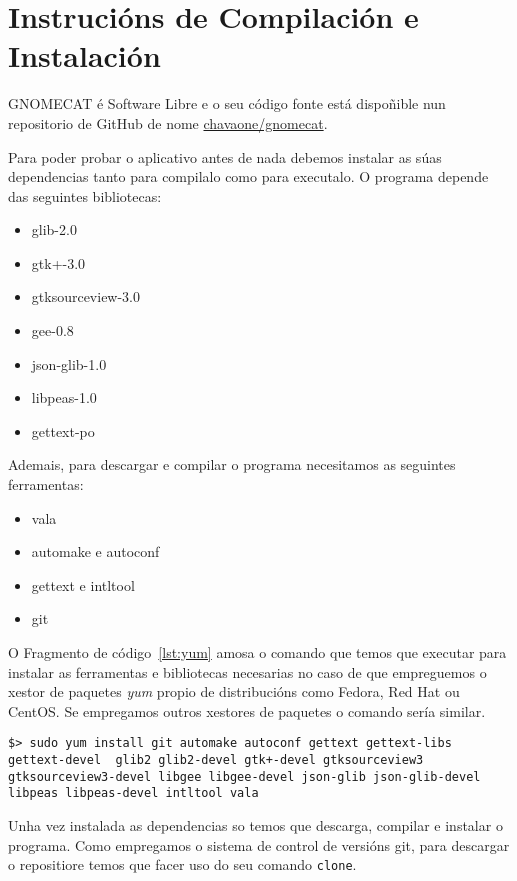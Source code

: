 \chapter{Instrucións de Compilación e Instalación}

GNOMECAT é Software Libre e o seu código fonte está dispoñible  nun repositorio de GitHub de nome \href{http://github.com/chavaone/gnomecat}{chavaone/gnomecat}.

Para poder probar o aplicativo antes de nada debemos instalar as súas dependencias tanto para compilalo como para executalo. O programa depende das seguintes bibliotecas:

\begin{itemize}
 \item glib-2.0
 \item gtk+-3.0
 \item gtksourceview-3.0
 \item gee-0.8
 \item json-glib-1.0
 \item libpeas-1.0
 \item gettext-po
\end{itemize}

Ademais, para descargar e compilar o programa necesitamos as seguintes ferramentas:

\begin{itemize}
\item vala
\item automake e autoconf
\item gettext e intltool
\item git
\end{itemize}

O Fragmento de código~\ref{lst:yum} amosa o comando que temos que executar para instalar as ferramentas e bibliotecas necesarias no caso de que empreguemos o xestor de paquetes \emph{yum} propio de distribucións como Fedora, Red Hat ou CentOS. Se empregamos outros xestores de paquetes o comando sería similar.

\begin{lstlisting}[label=lst:yum,caption=Comando para instalar utilidades e dependencias]
$> sudo yum install git automake autoconf gettext gettext-libs gettext-devel  glib2 glib2-devel gtk+-devel gtksourceview3 gtksourceview3-devel libgee libgee-devel json-glib json-glib-devel libpeas libpeas-devel intltool vala
\end{lstlisting}

Unha vez instalada as dependencias so temos que descarga, compilar e instalar o programa. Como empregamos o sistema de control de versións git, para descargar o repositiore temos que facer uso do seu comando \lstinline{clone}.

